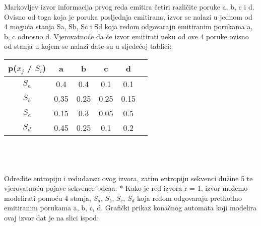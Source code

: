 \documentclass[12pt]{article}
\begin{document}
\begin{enumerate}
Markovljev izvor informacija prvog reda emitira četiri različite poruke a, b, c i d. Ovisno od toga koja je poruka posljednja emitirana, izvor se nalazi u jednom od 4 moguća stanja Sa, Sb, Sc i Sd koja redom odgovaraju emitiranim porukama a, b, c odnosno d. Vjerovatnoće da će izvor emitirati neku od ove 4 poruke ovisno od stanja u kojem se nalazi date su u sljedećoj tablici: \\

\begin{tabular}{|c|c|c|c|c|c|}
\hline
p(${x_j}$ / ${S_i}$) & a    & b    & c    & d    \\ \hline
${S_a}$        & 0.4  & 0.4  & 0.1  & 0.1  \\ \hline
${S_b}$        & 0.35 & 0.25 & 0.25 & 0.15 \\ \hline
${S_c}$        & 0.15 & 0.3  & 0.05 & 0.5  \\ \hline
${S_d}$        & 0.45 & 0.25 & 0.1  & 0.2  \\ \hline
\end{tabular} \\
\\
\\
Odredite entropiju i redudansu ovog izvora, zatim entropiju sekvenci dužine 5 te vjerovatnoću pojave sekvence bdcaa.
\newpage
* Kako je red izvora r = 1, izvor možemo modelirati pomoću 4 stanja,
$S_a$, $S_b$, $S_c$, $S_d$ koja redom odgovaraju prethodno emitiranim porukama a, b, c, d. 
Grafički prikaz konačnog automata koji modelira ovaj izvor dat je na slici
ispod:	\\
\\
\end{enumerate}
\end{document}

